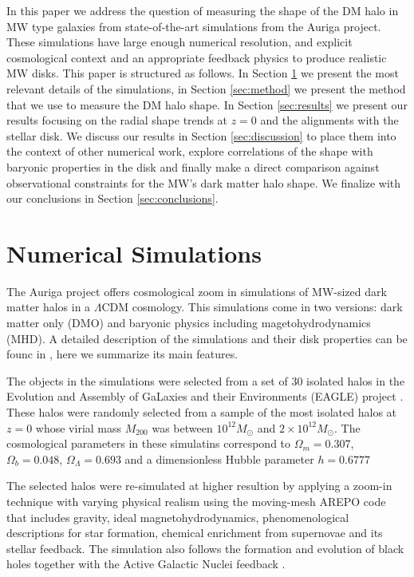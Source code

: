 \documentclass[a4paper,fleqn,usenatbib]{mnras}
\begin{document}
In this paper we address the question of measuring the shape of the DM
halo in MW type galaxies from state-of-the-art simulations from the
Auriga project.
These simulations have large enough numerical resolution, and explicit
cosmological context and an appropriate feedback physics to produce
realistic MW disks.
This paper is structured as follows. 
In Section \ref{sec:numerical} we present the most relevant details of
the simulations, in Section \ref{sec:method} we present the method
that we use to measure the DM halo shape. 
In Section \ref{sec:results} we present our results focusing on the
radial shape trends at $z=0$ and the alignments with the stellar disk.
We discuss our results in Section \ref{sec:discussion} to place them
into the context of other numerical work, explore correlations of the
shape with baryonic properties in the disk and finally make a direct
comparison against observational constraints for the MW's dark matter halo shape.
We finalize with our conclusions in Section \ref{sec:conclusions}.

\section{Numerical Simulations}
\label{sec:numerical}

The Auriga project offers cosmological zoom in simulations of MW-sized 
dark matter halos in a $\Lambda$CDM cosmology. 
This simulations come in two versions: dark matter only (DMO) and
baryonic physics including magetohydrodynamics (MHD).
A detailed description of the simulations and their disk properties
can be founc in \citep{auriga}, here we summarize its main features.

The objects in the simulations were selected from a set of 30
isolated halos in the Evolution and Assembly of GaLaxies and their
Environments (EAGLE)  project \citep{Eagle}.   
These halos were randomly selected from a sample of the most isolated
halos at $z=0$ whose virial mass $M_{200}$ was between $10^{12}M_\odot$ and
$2\times 10^{12}M_\odot$. 
The cosmological parameters in these simulatins correspond to
$\Omega_m=0.307$, $\Omega_b=0.048$, $\Omega_\Lambda=0.693$ and a
dimensionless Hubble parameter $h=0.6777$ \citep{2014A&A...571A..16P}

The selected halos were re-simulated at higher resultion by applying a
zoom-in technique with varying physical realism using the moving-mesh AREPO code
that includes gravity, ideal magnetohydrodynamics,  phenomenological
descriptions for star formation, chemical enrichment from supernovae
and its stellar feedback.   
The simulation also follows the formation and evolution of black holes
together with the Active Galactic Nuclei feedback
\citep{arepo,2013MNRAS.432..176P}. 
\end{document}
